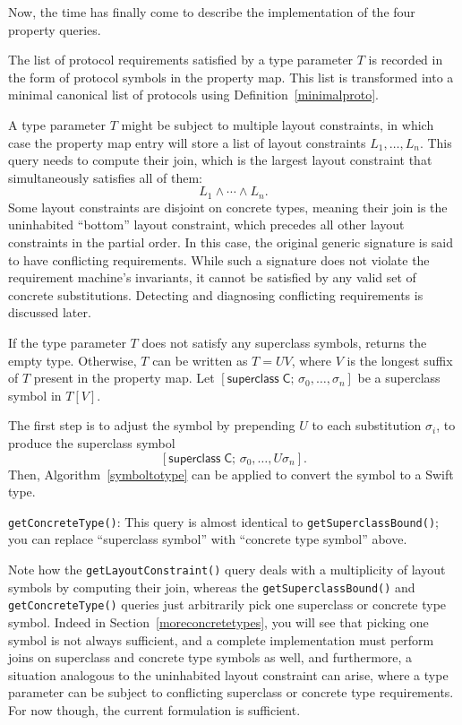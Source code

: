 \documentclass[headsepline,bibliography=totoc]{scrreport}
\newcommand{\namesym}[1]{\mathsf{#1}}
\newcommand{\supersym}[1]{[\mathsf{superclass}\;#1]}
\theoremstyle{definition}
\theoremstyle{definition}
\theoremstyle{definition}
\begin{document}
Now, the time has finally come to describe the implementation of the four property queries.
\begin{description}
\item[\texttt{getRequiredProtocols()}] The list of protocol requirements satisfied by a type parameter $T$ is recorded in the form of protocol symbols in the property map. This list is transformed into a minimal canonical list of protocols using Definition~\ref{minimalproto}.
\item[\texttt{getLayoutConstraint()}] A type parameter $T$ might be subject to multiple layout constraints, in which case the property map entry will store a list of layout constraints $L_1,\ldots,L_n$. This query needs to compute their join, which is the largest layout constraint that simultaneously satisfies all of them:
\[L_1\wedge\cdots\wedge L_n.\]
Some layout constraints are disjoint on concrete types, meaning their join is the uninhabited ``bottom'' layout constraint, which precedes all other layout constraints in the partial order. In this case, the original generic signature is said to have conflicting requirements. While such a signature does not violate the requirement machine's invariants, it cannot be satisfied by any valid set of concrete substitutions. Detecting and diagnosing conflicting requirements is discussed later.

\item[\texttt{getSuperclassBound()}] If the type parameter $T$ does not satisfy any superclass symbols, returns the empty type.
Otherwise, $T$ can be written as $T=UV$, where $V$ is the longest suffix of $T$ present in the property map. Let $\supersym{\namesym{C};\,\sigma_0,\ldots,\sigma_n}$ be a superclass symbol in $T[V]$.

The first step is to adjust the symbol by prepending $U$ to each substitution $\sigma_i$, to produce the superclass symbol
\[\supersym{\namesym{C};\,\sigma_0,\ldots,U\sigma_n}.\]
Then, Algorithm~\ref{symboltotype} can be applied to convert the symbol to a Swift type.
\item\texttt{getConcreteType()}: This query is almost identical to \texttt{getSuperclassBound()}; you can replace ``superclass symbol'' with ``concrete type symbol'' above.
\end{description}
Note how the \texttt{getLayoutConstraint()} query deals with a multiplicity of layout symbols by computing their join, whereas the \texttt{getSuperclassBound()} and \texttt{getConcreteType()} queries just arbitrarily pick one superclass or concrete type symbol. Indeed in Section~\ref{moreconcretetypes}, you will see that picking one symbol is not always sufficient, and a complete implementation must perform joins on superclass and concrete type symbols as well, and furthermore, a situation analogous to the uninhabited layout constraint can arise, where a type parameter can be subject to conflicting superclass or concrete type requirements. For now though, the current formulation is sufficient.
\end{document}
